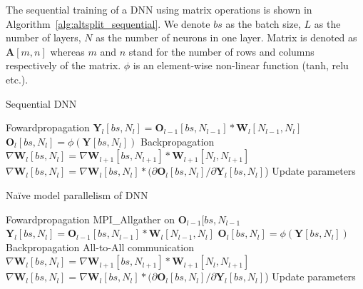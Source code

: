 The sequential training of a DNN using matrix operations is shown in 
Algorithm~\ref{alg:altsplit_sequential}. We denote $bs$ as the batch size, $L$ 
as the number of layers, $N$ as the number of neurons in one layer. Matrix is 
denoted as $\pmb{A}[m,n]$ whereas $m$ and $n$ stand for the number of rows and 
columns respectively of the matrix. $\phi$ is an element-wise non-linear 
function (tanh, relu etc.).
\begin{algorithm}[H]%
\caption{Sequential DNN}
\label{alg:altsplit_sequential}
{\fontsize{10}{10}\selectfont
\begin{algorithmic}[1]
    \Comment Fowardpropagation 
        \State $\pmb{Y}_l[bs, N_l] = \pmb{O}_{l-1}[bs, N_{l-1}] * \pmb{W}_{l}[N_{l-1}, N_l]$
        \State $\pmb{O}_l[bs, N_l] = \phi(\pmb{Y}[bs, N_l])$
    \EndFor
    \Comment Backpropagation 
    \State $\nabla \pmb{W}_l[bs, N_l]  = \nabla \pmb{W}_{l+1}[bs, N_{l+1}] * \pmb{W}_{l+1}[N_l, N_{l+1}]$
    \State $\nabla \pmb{W}_l[bs, N_l] = \nabla \pmb{W}_l[bs, N_l] * (\partial \pmb{O}_l[bs, N_l] / \partial \pmb{Y}_l[bs, N_l]$)
    \EndFor
    \State Update parameters
\end{algorithmic}}
\end{algorithm}

\begin{algorithm}[H]
\caption{Na\"{i}ve model parallelism of DNN}
\label{alg:altsplit_baseline}
{\fontsize{10}{10}\selectfont
\begin{algorithmic}[1]
    \Comment Fowardpropagation 
            \State MPI\_Allgather on $\pmb{O}_{l-1}[bs, N_{l-1}$
            \State $\pmb{Y}_l[bs, N_l] = \pmb{O}_{l-1}[bs, N_{l-1}] * \pmb{W}_{l}[N_{l-1}, N_l]$
            \State $\pmb{O}_l[bs, N_l] = \phi(\pmb{Y}[bs, N_l])$
        \EndFor
    \EndFor
    \Comment Backpropagation 
            \State All-to-All communication
            \State $\nabla \pmb{W}_l[bs, N_l]  = \nabla \pmb{W}_{l+1}[bs, N_{l+1}] * \pmb{W}_{l+1}[N_l, N_{l+1}]$
            \State $\nabla \pmb{W}_l[bs, N_l] = \nabla \pmb{W}_l[bs, N_l] * (\partial \pmb{O}_l[bs, N_l] / \partial \pmb{Y}_l[bs, N_l]$)
        \EndFor
    \EndFor
        \State Update parameters
    \EndFor
\end{algorithmic}}
\end{algorithm}

